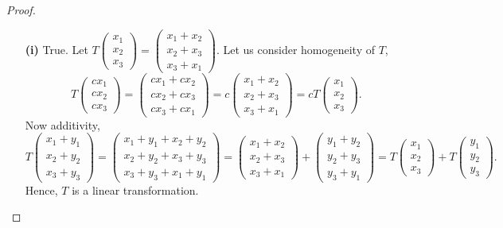 \documentclass[ 12pt ]{article}
\begin{document}
\begin{enumerate}
		\begin{proof}
			\begin{enumerate}
				\item[\textbf{(i)}] True. Let $T \begin{pmatrix} x_1 \\ x_2 \\ x_3 \end{pmatrix} = \begin{pmatrix} x_1 + x_2 \\ x_2 + x_3 \\ x_3 + x_1 \end{pmatrix}$.
					Let us consider homogeneity of $T$, $$T \begin{pmatrix} cx_1 \\ cx_2 \\ cx_3 \end{pmatrix} =
					\begin{pmatrix} cx_1 + cx_2 \\ cx_2 + cx_3 \\ cx_3 + cx_1 \end{pmatrix} = c\begin{pmatrix} x_1 + x_2 \\ x_2 + x_3 \\ x_3 + x_1 \end{pmatrix} =
					cT \begin{pmatrix} x_1 \\ x_2 \\ x_3 \end{pmatrix}.$$
					Now additivity, $$T \begin{pmatrix} x_1 + y_1 \\ x_2 + y_2 \\ x_3 + y_3 \end{pmatrix} =
					\begin{pmatrix} x_1 + y_1 + x_2 + y_2 \\ x_2 + y_2 + x_3 + y_3 \\ x_3 + y_3 + x_1 + y_1 \end{pmatrix} =
					\begin{pmatrix} x_1 + x_2 \\ x_2 + x_3 \\ x_3 + x_1 \end{pmatrix} + \begin{pmatrix} y_1 + y_2 \\ y_2 + y_3 \\ y_3 + y_1 \end{pmatrix} =
					T \begin{pmatrix} x_1 \\ x_2 \\ x_3 \end{pmatrix} + T \begin{pmatrix} y_1 \\ y_2 \\ y_3 \end{pmatrix}.$$ Hence, $T$ is a linear transformation.

\end{enumerate}
\end{proof}
\end{enumerate}
\end{document}

